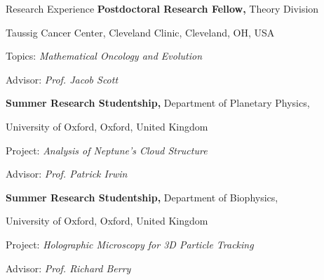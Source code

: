 \begin{rubric}{Research Experience}
%
	\textbf{Postdoctoral Research Fellow,} Theory Division \par Taussig Cancer Center, Cleveland Clinic, Cleveland, OH, USA
 \par Topics: \emph{Mathematical Oncology and Evolution}
 \par Advisor: \emph{Prof. Jacob Scott}

\entry*[2014] \textbf{Summer Research Studentship,} Department of Planetary Physics, \par University of Oxford, Oxford, United Kingdom
\par Project: \emph{Analysis of Neptune's Cloud Structure}
\par Advisor: \emph{Prof. Patrick Irwin}

\entry*[2013] \textbf{Summer Research Studentship,} Department of Biophysics, \par University of Oxford, Oxford, United Kingdom
\par Project: \emph{Holographic Microscopy for 3D Particle Tracking}
\par Advisor: \emph{Prof. Richard Berry}
%
\end{rubric}
